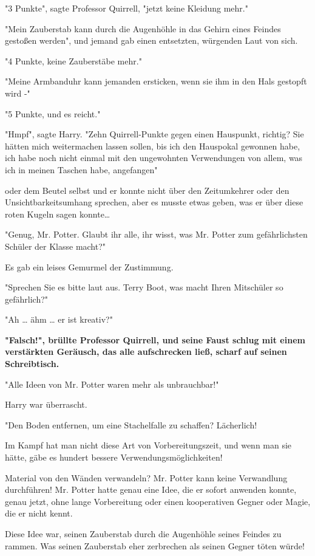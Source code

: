 {"3 Punkte", sagte Professor Quirrell, "jetzt keine Kleidung mehr."

"Mein Zauberstab kann durch die Augenhöhle in das Gehirn eines Feindes gestoßen werden", und jemand gab einen entsetzten, würgenden Laut von sich.

"4 Punkte, keine Zauberstäbe mehr."

"Meine Armbanduhr kann jemanden ersticken, wenn sie ihm in den Hals gestopft wird -"

"5 Punkte, und es reicht."

"Hmpf", sagte Harry. "Zehn Quirrell-Punkte gegen einen Hauspunkt, richtig? Sie hätten mich weitermachen lassen sollen, bis ich den Hauspokal gewonnen habe, ich habe noch nicht einmal mit den ungewohnten Verwendungen von allem, was ich in meinen Taschen habe, angefangen"

oder dem Beutel selbst und er konnte nicht über den Zeitumkehrer oder den Unsichtbarkeitsumhang sprechen, aber es musste etwas geben, was er über diese roten Kugeln sagen konnte…

"Genug, Mr. Potter. Glaubt ihr alle, ihr wisst, was Mr. Potter zum gefährlichsten Schüler der Klasse macht?"

Es gab ein leises Gemurmel der Zustimmung.

"Sprechen Sie es bitte laut aus. Terry Boot, was macht Ihren Mitschüler so gefährlich?"

"Ah … ähm … er ist kreativ?"

\textbf{"Falsch!", brüllte Professor Quirrell, und seine Faust schlug mit einem verstärkten Geräusch, das alle aufschrecken ließ, scharf auf seinen Schreibtisch.}

"Alle Ideen von Mr. Potter waren mehr als unbrauchbar!"

Harry war überrascht.

"Den Boden entfernen, um eine Stachelfalle zu schaffen? Lächerlich!

Im Kampf hat man nicht diese Art von Vorbereitungszeit, und wenn man sie hätte, gäbe es hundert bessere Verwendungsmöglichkeiten!

Material von den Wänden verwandeln? Mr. Potter kann keine Verwandlung durchführen! Mr. Potter hatte genau eine Idee, die er sofort anwenden konnte, genau jetzt, ohne lange Vorbereitung oder einen kooperativen Gegner oder Magie, die er nicht kennt.

Diese Idee war, seinen Zauberstab durch die Augenhöhle seines Feindes zu rammen. Was seinen Zauberstab eher zerbrechen als seinen Gegner töten würde!

}
